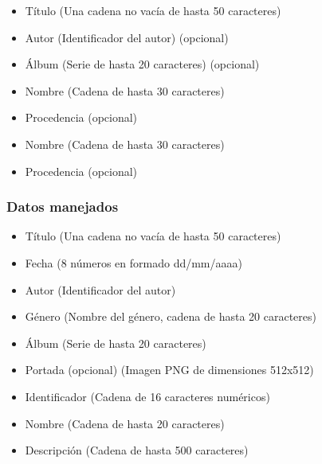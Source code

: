 \begin{itemize}
\item Título (Una cadena no vacía de hasta 50 caracteres)
\item Autor (Identificador del autor) (opcional)
\item Álbum (Serie de hasta 20 caracteres) (opcional)
\end{itemize}

\begin{itemize}
\item Nombre (Cadena de hasta 30 caracteres)
\item Procedencia (opcional)
\end{itemize}

\begin{itemize}
\item Nombre (Cadena de hasta 30 caracteres)
\item Procedencia (opcional)
\end{itemize}

\subsubsection{Datos manejados}
\setcounter{RD}{1}

\begin{itemize}
  \item Título (Una cadena no vacía de hasta 50 caracteres)
  \item Fecha (8 números en formado dd/mm/aaaa)
  \item Autor (Identificador del autor)
  \item Género (Nombre del género, cadena de hasta 20 caracteres)
  \item Álbum (Serie de hasta 20 caracteres)
  \item Portada (opcional) (Imagen PNG de dimensiones 512x512)
  \item Identificador (Cadena de 16 caracteres numéricos)
\end{itemize}

\begin{itemize}
  \item Nombre (Cadena de hasta 20 caracteres)
  \item Descripción (Cadena de hasta 500 caracteres)
\end{itemize}

